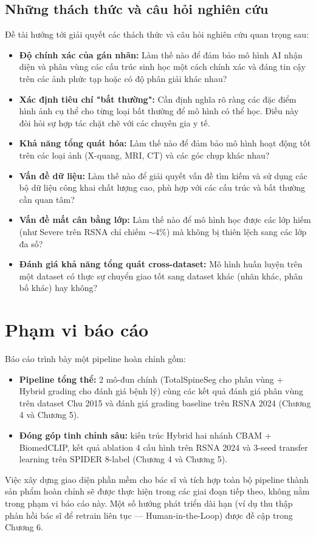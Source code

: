\subsection*{Những thách thức và câu hỏi nghiên cứu}
Đề tài hướng tới giải quyết các thách thức và câu hỏi nghiên cứu quan trọng sau:
\begin{itemize}
    \item \textbf{Độ chính xác của gán nhãn:} Làm thế nào để đảm bảo mô hình AI nhận diện và phân vùng các cấu trúc sinh học một cách chính xác và đáng tin cậy trên các ảnh phức tạp hoặc có độ phân giải khác nhau?
    \item \textbf{Xác định tiêu chí "bất thường":} Cần định nghĩa rõ ràng các đặc điểm hình ảnh cụ thể cho từng loại bất thường để mô hình có thể học. Điều này đòi hỏi sự hợp tác chặt chẽ với các chuyên gia y tế.
    \item \textbf{Khả năng tổng quát hóa:} Làm thế nào để đảm bảo mô hình hoạt động tốt trên các loại ảnh (X-quang, MRI, CT) và các góc chụp khác nhau?
    \item \textbf{Vấn đề dữ liệu:} Làm thế nào để giải quyết vấn đề tìm kiếm và sử dụng các bộ dữ liệu công khai chất lượng cao, phù hợp với các cấu trúc và bất thường cần quan tâm?
    \item \textbf{Vấn đề mất cân bằng lớp:} Làm thế nào để mô hình học được các lớp hiếm (như Severe trên RSNA chỉ chiếm $\sim$4\%) mà không bị thiên lệch sang các lớp đa số?
    \item \textbf{Đánh giá khả năng tổng quát cross-dataset:} Mô hình huấn luyện trên một dataset có thực sự chuyển giao tốt sang dataset khác (nhãn khác, phân bố khác) hay không?
\end{itemize}

\section{Phạm vi báo cáo}
Báo cáo trình bày một pipeline hoàn chỉnh gồm:
\begin{itemize}
    \item \textbf{Pipeline tổng thể:} 2 mô-đun chính (TotalSpineSeg cho phân vùng + Hybrid grading cho đánh giá bệnh lý) cùng các kết quả đánh giá phân vùng trên dataset Chu 2015 và đánh giá grading baseline trên RSNA 2024 (Chương 4 và Chương 5).
    \item \textbf{Đóng góp tinh chỉnh sâu:} kiến trúc Hybrid hai nhánh CBAM + BiomedCLIP, kết quả ablation 4 cấu hình trên RSNA 2024 và 3-seed transfer learning trên SPIDER 8-label (Chương 4 và Chương 5).
\end{itemize}

Việc xây dựng giao diện phần mềm cho bác sĩ và tích hợp toàn bộ pipeline thành sản phẩm hoàn chỉnh sẽ được thực hiện trong các giai đoạn tiếp theo, không nằm trong phạm vi báo cáo này. Một số hướng phát triển dài hạn (ví dụ thu thập phản hồi bác sĩ để retrain liên tục --- Human-in-the-Loop) được đề cập trong Chương 6.
